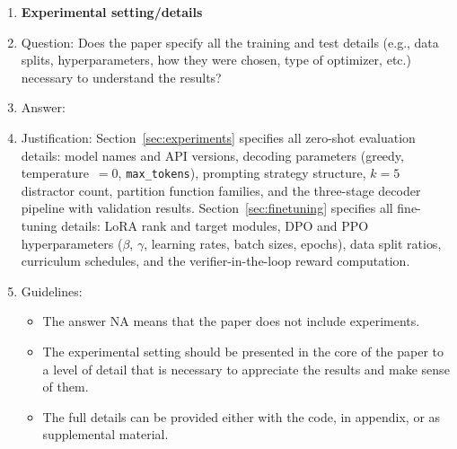 \documentclass{article}
\theoremstyle{definition}
\begin{document}
\begin{enumerate}
\item {\bf Experimental setting/details}
    \item[] Question: Does the paper specify all the training and test details (e.g., data splits, hyperparameters, how they were chosen, type of optimizer, etc.) necessary to understand the results?
    \item[] Answer: \answerYes{}
    \item[] Justification: Section~\ref{sec:experiments} specifies all zero-shot evaluation details: model names and API versions, decoding parameters (greedy, temperature~$=0$, \texttt{max\_tokens}), prompting strategy structure, $k=5$ distractor count, partition function families, and the three-stage decoder pipeline with validation results. Section~\ref{sec:finetuning} specifies all fine-tuning details: LoRA rank and target modules, DPO and PPO hyperparameters ($\beta$, $\gamma$, learning rates, batch sizes, epochs), data split ratios, curriculum schedules, and the verifier-in-the-loop reward computation.
    \item[] Guidelines:
    \begin{itemize}
        \item The answer NA means that the paper does not include experiments.
        \item The experimental setting should be presented in the core of the paper to a level of detail that is necessary to appreciate the results and make sense of them.
        \item The full details can be provided either with the code, in appendix, or as supplemental material.
    \end{itemize}


\end{enumerate}
\end{document}
